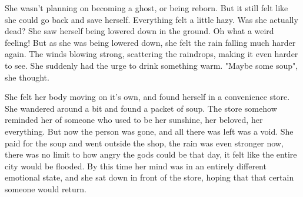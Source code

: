 \documentclass[a4paper, 10pt]{article}
\begin{document}
She wasn't planning on becoming a ghost, or being reborn. But it still felt like she could go back and save herself. Everything felt a little hazy. Was she actually dead? She saw herself being lowered down in the ground. Oh what a weird feeling! But as she was being lowered down, she felt the rain falling much harder again. The winds blowing strong, scattering the raindrops, making it even harder to see. She suddenly had the urge to drink something warm. "Maybe some soup", she thought.

She felt her body moving on it's own, and found herself in a convenience store. She wandered around a bit and found a packet of soup. The store somehow reminded her of someone who used to be her sunshine, her beloved, her everything. But now the person was gone, and all there was left was a void. She paid for the soup and went outside the shop, the rain was even stronger now, there was no limit to how angry the gods could be that day, it felt like the entire city would be flooded. By this time her mind was in an entirely different emotional state, and she sat down in front
of the store, hoping that that certain someone would return.
\end{document}
